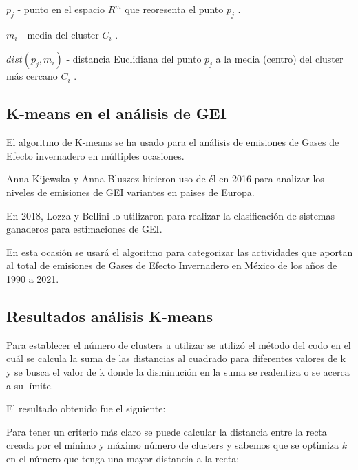 \documentclass[13.6pt]{article}
\begin{document}
$p_j$ - punto en el espacio $R^m$ que reoresenta el punto $p_j$ .

$m_i$ - media del cluster $C_i$ .

$ dist(p_j , m_i)$ - distancia Euclidiana del punto $p_j$ a la media (centro) del cluster más cercano $C_i$ . 

\citep{KIJEWSKA2016935}



\subsection{K-means en el análisis de GEI}
El algoritmo de K-means se ha usado para el análisis de emisiones de Gases de Efecto invernadero en múltiples ocasiones.

Anna Kijewska y Anna Bluszcz hicieron uso de él en 2016 para analizar los niveles de emisiones de GEI variantes en paises de Europa. \citep{KIJEWSKA2016935}

En 2018, Lozza y Bellini lo utilizaron para realizar la clasificación de sistemas ganaderos para estimaciones de GEI. \citep{lozza2018clasificacion}

En esta ocasión se usará el algoritmo para categorizar las actividades que aportan al total de emisiones de Gases de Efecto Invernadero en México de los años de 1990 a 2021.


\subsection{Resultados análisis K-means}
Para establecer el número de clusters a utilizar se utilizó el método del codo en el cuál se calcula la suma de las distancias al cuadrado para diferentes valores de k y se busca el valor de k donde la disminución en la suma se realentiza o se acerca a su límite. 

El resultado obtenido fue el siguiente:


Para tener un criterio más claro se puede calcular la distancia entre la recta creada por el mínimo y máximo número de clusters y sabemos que se optimiza $k$ en el número que tenga una mayor distancia a la recta:
\end{document}

